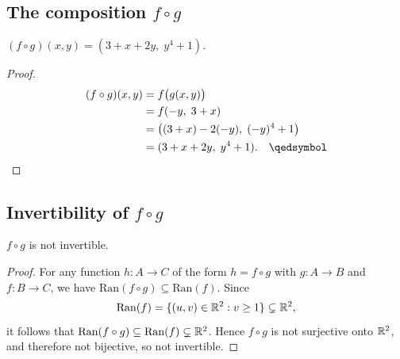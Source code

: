 \subsection{The composition \texorpdfstring{$f \circ g$}{f∘g}}

\begin{proposition}
$(f \circ g)(x, y) = (3 + x + 2y,\; y^4 + 1)$.
\end{proposition}

\begin{proof}
\begin{align*}
    (f \circ g)(x, y)
    &= f\bigl(g(x, y)\bigr) \\
    &= f(-y,\; 3 + x) \\
    &= \bigl((3 + x) - 2(-y),\; (-y)^4 + 1\bigr) \\
    &= (3 + x + 2y,\; y^4 + 1). \qedhere
\end{align*}
\end{proof}

\subsection{Invertibility of \texorpdfstring{$f \circ g$}{f∘g}}


\begin{proposition}
$f \circ g$ is not invertible.
\end{proposition}

\begin{proof}
For any function $h : A \to C$ of the form $h = f \circ g$ with $g : A \to B$
and $f : B \to C$, we have $\mathrm{Ran}(f \circ g) \subseteq \mathrm{Ran}(f)$.
Since
\[
    \mathrm{Ran}(f) = \{(u,v) \in \mathbb{R}^{2} : v \geq 1\} \subsetneq \mathbb{R}^{2},
\]
it follows that $\mathrm{Ran}(f \circ g) \subseteq \mathrm{Ran}(f) \subsetneq
\mathbb{R}^{2}$. Hence $f \circ g$ is not surjective onto $\mathbb{R}^{2}$, and therefore not
bijective, so not invertible.
\end{proof}

